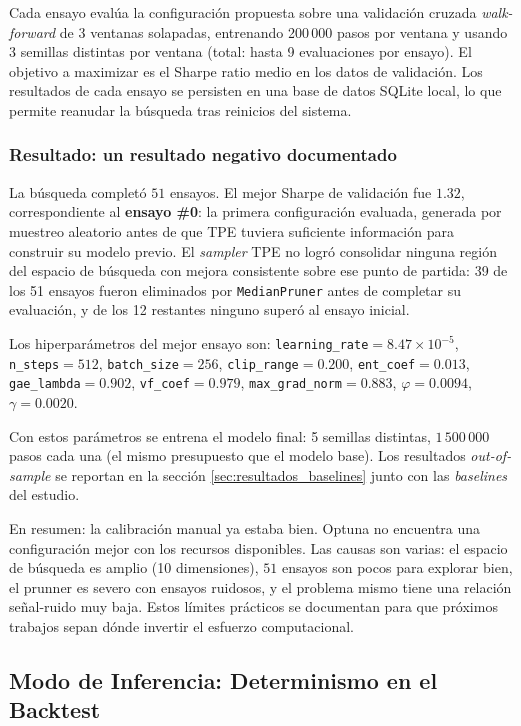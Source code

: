 \documentclass[IB,a4paper]{TFUOC}
\begin{document}
Cada ensayo evalúa la configuración propuesta sobre una validación cruzada \textit{walk-forward} de 3 ventanas solapadas, entrenando 200\,000 pasos por ventana y usando 3 semillas distintas por ventana (total: hasta 9 evaluaciones por ensayo). El objetivo a maximizar es el Sharpe ratio medio en los datos de validación. Los resultados de cada ensayo se persisten en una base de datos SQLite local, lo que permite reanudar la búsqueda tras reinicios del sistema.

\subsubsection*{Resultado: un resultado negativo documentado}

La búsqueda completó $51$ ensayos. El mejor Sharpe de validación fue $1.32$, correspondiente al \textbf{ensayo \#0}: la primera configuración evaluada, generada por muestreo aleatorio antes de que TPE tuviera suficiente información para construir su modelo previo. El \textit{sampler} TPE no logró consolidar ninguna región del espacio de búsqueda con mejora consistente sobre ese punto de partida: 39 de los 51 ensayos fueron eliminados por \texttt{MedianPruner} antes de completar su evaluación, y de los 12 restantes ninguno superó al ensayo inicial.

Los hiperparámetros del mejor ensayo son: \texttt{learning\_rate}$=8.47\!\times\!10^{-5}$, \texttt{n\_steps}$=512$, \texttt{batch\_size}$=256$, \texttt{clip\_range}$=0.200$, \texttt{ent\_coef}$=0.013$, \texttt{gae\_lambda}$=0.902$, \texttt{vf\_coef}$=0.979$, \texttt{max\_grad\_norm}$=0.883$, $\varphi=0.0094$, $\gamma=0.0020$.

Con estos parámetros se entrena el modelo final: 5 semillas distintas, $1\,500\,000$ pasos cada una (el mismo presupuesto que el modelo base). Los resultados \textit{out-of-sample} se reportan en la sección \ref{sec:resultados_baselines} junto con las \textit{baselines} del estudio.

En resumen: la calibración manual ya estaba bien. Optuna no encuentra una configuración mejor con los recursos disponibles. Las causas son varias: el espacio de búsqueda es amplio (10 dimensiones), $51$ ensayos son pocos para explorar bien, el prunner es severo con ensayos ruidosos, y el problema mismo tiene una relación señal-ruido muy baja. Estos límites prácticos se documentan para que próximos trabajos sepan dónde invertir el esfuerzo computacional.

\subsection{Modo de Inferencia: Determinismo en el Backtest}
\label{sec:inferencia_determinista}
\end{document}
